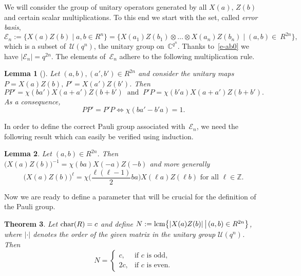 \documentclass[11pt]{article}
\newtheorem{theo}{Theorem}[section]
\newtheorem{lem}[theo]{Lemma}
\theoremstyle{definition}
\numberwithin{equation}{section}
\newcommand{\Z}{{\mathbb Z}}
\newcommand{\C}{{\mathbb C}}
\newcommand{\cE}{{\mathcal E}}
\newcommand{\cU}{{\mathcal U}}
\newcommand{\Char}{\mbox{${\rm char}$}}
\newcommand{\lcm}{\mbox{\rm lcm}}
\newcounter{ara}
\begin{document}
We will consider the group of unitary operators generated by all $X(a),\,Z(b)$ and certain scalar multiplications.
To this end we start with the set, called \emph{error basis},
\begin{equation}\label{e-En}
   \cE_n:=\{X(a)Z(b)\mid a,b\in R^n\}=\{X(a_1)Z(b_1)\otimes\ldots\otimes X(a_n)Z(b_n)\mid (a,b)\in\ R^{2n}\},
\end{equation}
which is a subset of~$\cU(q^n)$,  the unitary group on~$\C^{q^n}$.
Thanks to~\eqref{e-ab0} we have $|\cE_n|=q^{2n}$.
The elements of~$\cE_n$ adhere to the following multiplication rule.

\begin{lem}[\mbox{\cite[Prop.~4 and proof]{NaKl12}}]\label{L-MultEn}
Let $(a,b),(a',b')\in R^{2n}$ and consider the unitary maps $P=X(a)Z(b),\,P'=X(a')Z(b')$. Then
\[
   PP'=\chi(b a')X(a+a')Z(b+b')\ \text{ and }\ P'P=\chi(b'a)X(a+a')Z(b+b').
\]
As a consequence,
\[
    PP'=P'P\Longleftrightarrow \chi(b a'-b' a)=1.
\]
\end{lem}


In order to define the correct Pauli group associated with~$\cE_n$, we need the following result which can easily be verified using induction.
\begin{lem}\label{L-orderXaZb}
Let $(a,b)\in R^{2n}$. Then $\big(X(a)Z(b)\big)^{-1}=\chi(ba)X(-a)Z(-b)$ and more generally
\[
     \big(X(a)Z(b)\big)^\ell=\chi\Big(\frac{\ell(\ell-1)}{2}ba\Big)X(\ell a)Z(\ell b)\text{ for all }\ell\in\Z.
\]
\end{lem}

Now we are ready to define a parameter that will be crucial for the definition of the Pauli group.

\begin{theo}\label{T-exponent}
Let $\Char(R)=c$ and define $N:=\lcm\big\{|X(a)Z(b)|\,\big|\, (a,b)\in R^{2n}\big\}$,
where $|\cdot|$ denotes the order of the given matrix in the unitary group $\cU(q^n)$. Then
\[
   N=\left\{\begin{array}{cl}c,&\text{if $c$ is odd,}\\[.5ex] 2c,&\text{if~$c$ is even.}\end{array}\right.
\]
\end{theo}
\end{document}
